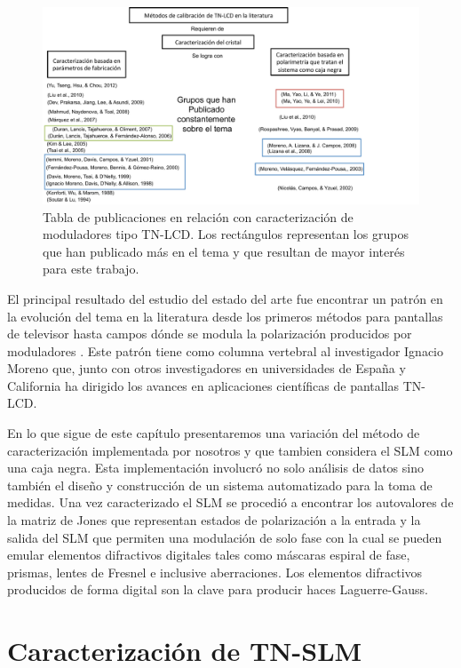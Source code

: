 \begin{figure}[h!]
\centering
\includegraphics[scale=.6]{articulos_metodos}
\caption[Publicaciones en relación a la caracterización de TN-LCD]{Tabla de publicaciones en relación con caracterización de
  moduladores tipo TN-LCD. Los rectángulos representan los grupos que
  han publicado más en el tema y que resultan de mayor interés para
  este trabajo. }
\label{fig:articulos_metodos}
\end{figure}
El principal resultado del estudio del estado del arte fue encontrar
un patrón en la evolución del tema en la literatura desde los primeros
métodos para pantallas de televisor  hasta campos
dónde se modula la polarización producidos por moduladores
. Este patrón tiene como columna vertebral al 
investigador Ignacio Moreno que, junto con otros investigadores en
universidades de España y California ha dirigido los avances en aplicaciones
científicas de pantallas TN-LCD. 

En lo que sigue de este capítulo presentaremos una variación del
método de caracterización  implementada por nosotros y que
tambien considera el SLM como una caja negra. Esta implementación
involucró no solo análisis de datos sino también el diseño y
construcción de un sistema automatizado para la toma de medidas. 
Una vez caracterizado el SLM se
procedió a encontrar los autovalores de la matriz de Jones que
representan estados de polarización a la entrada y la salida del SLM 
que permiten una modulación de solo fase con la cual se pueden emular
elementos difractivos digitales tales como máscaras espiral de fase, prismas,
lentes de Fresnel e inclusive aberraciones. Los elementos difractivos producidos de forma
digital son la clave para producir haces Laguerre-Gauss.

\section{Caracterización de TN-SLM}
\label{sec:ChPD_Caracterizacion_de_SLM}

